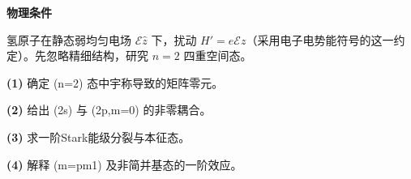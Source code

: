 \textbf{物理条件}\par 氢原子在静态弱均匀电场 \(\mathcal E\hat z\) 下，扰动 \(H' = e\mathcal E z\)（采用电子电势能符号的这一约定）。先忽略精细结构，研究 \(n=2\) 四重空间态。
\par\noindent\textbf{(1)} 确定 (n=2) 态中宇称导致的矩阵零元。
\par\noindent\textbf{(2)} 给出 (2s) 与 (2p,m=0) 的非零耦合。
\par\noindent\textbf{(3)} 求一阶Stark能级分裂与本征态。
\par\noindent\textbf{(4)} 解释 (m=pm1) 及非简并基态的一阶效应。
